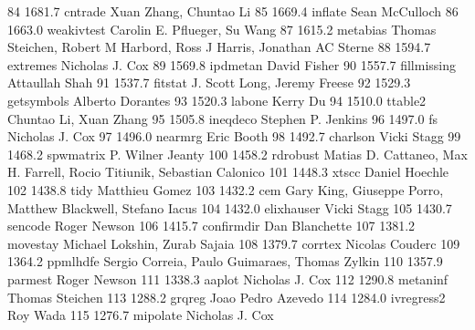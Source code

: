     84   1681.7    cntrade       Xuan Zhang, Chuntao Li                  
    85   1669.4    inflate       Sean McCulloch                          
    86   1663.0    weakivtest    Carolin E. Pflueger, Su Wang            
    87   1615.2    metabias      Thomas Steichen, Robert M Harbord, Ross 
                                   J Harris, Jonathan AC Sterne            
    88   1594.7    extremes      Nicholas J. Cox                         
    89   1569.8    ipdmetan      David Fisher                            
    90   1557.7    fillmissing   Attaullah Shah                          
    91   1537.7    fitstat       J. Scott Long, Jeremy Freese            
    92   1529.3    getsymbols    Alberto Dorantes                        
    93   1520.3    labone        Kerry Du                                
    94   1510.0    ttable2       Chuntao Li, Xuan Zhang                  
    95   1505.8    ineqdeco      Stephen P. Jenkins                      
    96   1497.0    fs            Nicholas J. Cox                         
    97   1496.0    nearmrg       Eric Booth                              
    98   1492.7    charlson      Vicki Stagg                             
    99   1468.2    spwmatrix     P. Wilner Jeanty                        
   100   1458.2    rdrobust      Matias D. Cattaneo, Max H. Farrell,     
                                   Rocio Titiunik, Sebastian Calonico      
   101   1448.3    xtscc         Daniel Hoechle                          
   102   1438.8    tidy          Matthieu Gomez                          
   103   1432.2    cem           Gary King, Giuseppe Porro, Matthew      
                                   Blackwell, Stefano Iacus                
   104   1432.0    elixhauser    Vicki Stagg                             
   105   1430.7    sencode       Roger Newson                            
   106   1415.7    confirmdir    Dan Blanchette                          
   107   1381.2    movestay      Michael Lokshin, Zurab Sajaia           
   108   1379.7    corrtex       Nicolas Couderc                         
   109   1364.2    ppmlhdfe      Sergio Correia, Paulo Guimaraes, Thomas 
                                   Zylkin                                  
   110   1357.9    parmest       Roger Newson                            
   111   1338.3    aaplot        Nicholas J. Cox                         
   112   1290.8    metaninf      Thomas Steichen                         
   113   1288.2    grqreg        Joao Pedro Azevedo                      
   114   1284.0    ivregress2    Roy Wada                                
   115   1276.7    mipolate      Nicholas J. Cox                         
